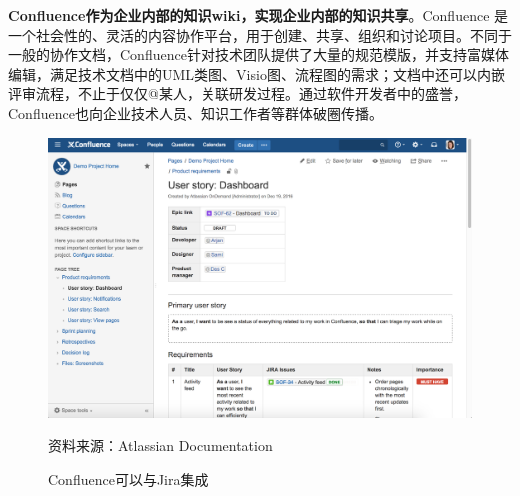 \textbf{Confluence作为企业内部的知识wiki，实现企业内部的知识共享}。Confluence 是一个社会性的、灵活的内容协作平台，用于创建、共享、组织和讨论项目。不同于一般的协作文档，Confluence针对技术团队提供了大量的规范模版，并支持富媒体编辑，满足技术文档中的UML类图、Visio图、流程图的需求；文档中还可以内嵌评审流程，不止于仅仅@某人，关联研发过程。通过软件开发者中的盛誉，Confluence也向企业技术人员、知识工作者等群体破圈传播。
\begin{figure}[H]
    \caption{Confluence可以与Jira集成}
    \begin{center}
        \includegraphics[width=0.8\linewidth]{img/Using+Confluence+with+JIRA.png}
    \end{center}
    \footnotesize{资料来源：Atlassian Documentation}
\end{figure}

